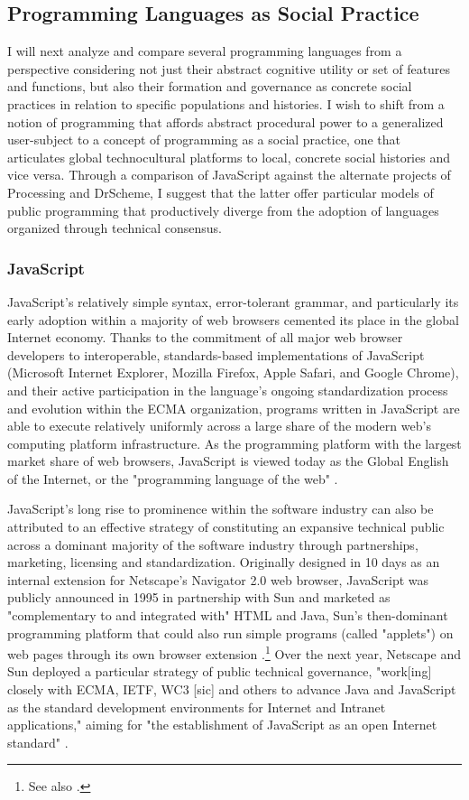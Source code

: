 \subsection*{Programming Languages as Social Practice}
I will next analyze and compare several programming languages from a perspective considering not just their abstract cognitive utility or set of features and functions, but also their formation and governance as concrete social practices in relation to specific populations and histories. I wish to shift from a notion of programming that affords abstract procedural power to a generalized user-subject to a concept of programming as a social practice, one that articulates global technocultural platforms to local, concrete social histories and vice versa. Through a comparison of JavaScript against the alternate projects of Processing and DrScheme, I suggest that the latter offer particular models of public programming that productively diverge from the adoption of languages organized through technical consensus.

\subsubsection*{JavaScript}
JavaScript's relatively simple syntax, error-tolerant grammar, and particularly its early adoption within a majority of web browsers cemented its place in the global Internet economy. Thanks to the commitment of all major web browser developers to interoperable, standards-based implementations of JavaScript (Microsoft Internet Explorer, Mozilla Firefox, Apple Safari, and Google Chrome), and their active participation in the language's ongoing standardization process and evolution within the ECMA organization, programs written in JavaScript are able to execute relatively uniformly across a large share of the modern web's computing platform infrastructure. As the programming platform with the largest market share of web browsers, JavaScript is viewed today as the Global English of the Internet, or the "programming language of the web" \autocite{Codecademy}.

JavaScript's long rise to prominence within the software industry can also be attributed to an effective strategy of constituting an expansive technical public across a dominant majority of the software industry through partnerships, marketing, licensing and standardization. Originally designed in 10 days as an internal extension for Netscape's Navigator 2.0 web browser, JavaScript was publicly announced in 1995 in partnership with Sun and marketed as "complementary to and integrated with" HTML and Java, Sun's then-dominant programming platform that could also run simple programs (called "applets") on web pages through its own browser extension \autocite{Netscape95}.\footnote{ See also  \autocite{Severance2012}.} Over the next year, Netscape and Sun deployed a particular strategy of public technical governance, "work[ing] closely with ECMA, IETF, WC3 [sic] and others to advance Java and JavaScript as the standard development environments for Internet and Intranet applications," aiming for "the establishment of JavaScript as an open Internet standard" \autocite{Netscape96}.

